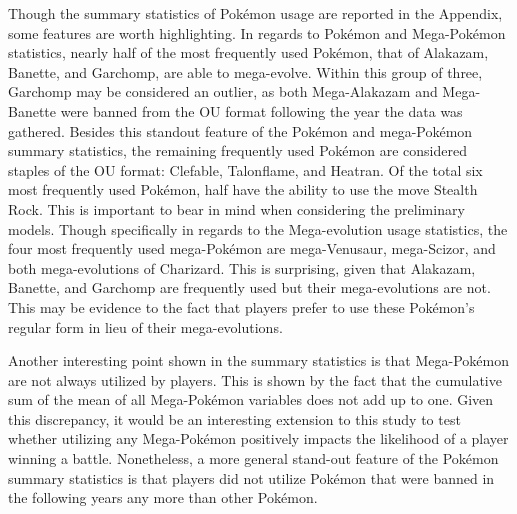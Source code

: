 \documentclass[12pt,twoside]{reedthesis}
\begin{document}
  Though the summary statistics of Pokémon usage are reported in the
  Appendix, some features are worth highlighting. In regards to Pokémon
  and Mega-Pokémon statistics, nearly half of the most frequently used
  Pokémon, that of Alakazam, Banette, and Garchomp, are able to
  mega-evolve. Within this group of three, Garchomp may be considered an
  outlier, as both Mega-Alakazam and Mega-Banette were banned from the OU
  format following the year the data was gathered. Besides this standout
  feature of the Pokémon and mega-Pokémon summary statistics, the
  remaining frequently used Pokémon are considered staples of the OU
  format: Clefable, Talonflame, and Heatran. Of the total six most
  frequently used Pokémon, half have the ability to use the move Stealth
  Rock. This is important to bear in mind when considering the preliminary
  models. Though specifically in regards to the Mega-evolution usage
  statistics, the four most frequently used mega-Pokémon are
  mega-Venusaur, mega-Scizor, and both mega-evolutions of Charizard. This
  is surprising, given that Alakazam, Banette, and Garchomp are frequently
  used but their mega-evolutions are not. This may be evidence to the fact
  that players prefer to use these Pokémon's regular form in lieu of their
  mega-evolutions.
  
  Another interesting point shown in the summary statistics is that
  Mega-Pokémon are not always utilized by players. This is shown by the
  fact that the cumulative sum of the mean of all Mega-Pokémon variables
  does not add up to one. Given this discrepancy, it would be an
  interesting extension to this study to test whether utilizing any
  Mega-Pokémon positively impacts the likelihood of a player winning a
  battle. Nonetheless, a more general stand-out feature of the Pokémon
  summary statistics is that players did not utilize Pokémon that were
  banned in the following years any more than other Pokémon.
  
\end{document}
